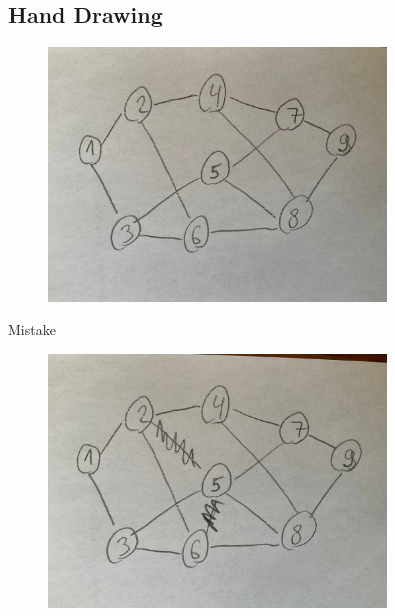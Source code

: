 \documentclass[11pt]{beamer}
\begin{document}
\subsection{Hand Drawing}
\begin{frame}{\subsecname}
    \begin{figure}
        \centering
        \includegraphics[width=0.8\textwidth]{figures/hand1.jpg}
    \end{figure}
\end{frame}

\begin{frame}{\subsecname}{Mistake}
    \begin{figure}
        \centering
        \includegraphics[width=0.8\textwidth]{figures/hand2.jpg}
    \end{figure}
\end{frame}
\end{document}
